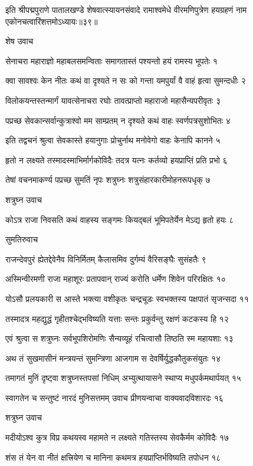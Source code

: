 इति श्रीपद्मपुराणे पातालखण्डे शेषवात्स्यायनसंवादे रामाश्वमेधे वीरमणिपुत्रेण हयग्रहणं नाम एकोनचत्वारिंशत्तमोऽध्यायः॥३९॥


शेष उवाच

सेनाचरा महाराज्ञो महाबलसमन्विताः
समागतास्तं पश्यन्तो हयं रामस्य भूपतेः १

क्वा सावश्वः केन नीतः कथं वा दृश्यते न सः
को गन्ता यमपुर्यां वै वाहं हृत्वा सुमन्दधीः २

विलोकयन्तस्तन्मार्गं यावत्सेनाचरा रघोः
तावत्प्राप्तो महाराजो महासैन्यपरीवृतः ३

पप्रच्छ सेवकान्सर्वान्कुत्राश्वो मम साम्प्रतम्
न दृश्यते कथं वाहः स्वर्णपत्रसुशोभितः ४

इति तद्वचनं श्रुत्वा सेवकास्ते हयानुगाः
प्रोचुर्नाथ मनोवेगो वाहः केनापि कानने ५

हृतो न लक्ष्यते तस्मादस्माभिर्मार्गकोविदैः
तदत्र यत्नः कर्तव्यो हयप्राप्तिं प्रति प्रभो ६

तेषां वचनमाकर्ण्य पप्रच्छ सुमतिं नृपः
शत्रुघ्नः शत्रुसंहारकारीमोहनरूपधृक् ७

शत्रुघ्न उवाच

कोऽत्र राजा निवसति कथं वाहस्य सङ्गमः
कियद्बलं भूमिपतेर्येन मेऽद्य हृतो हयः ८

सुमतिरुवाच

राजन्देवपुरं ह्येतद्देवेनैव विनिर्मितम्
कैलासमिव दुर्गम्यं वैरिसङ्घैः सुसंहतैः ९

अस्मिन्वीरमणी राजा महाशूरः प्रतापवान्
राज्यं करोति धर्मेण शिवेन परिरक्षितः १०

योऽसौ प्रलयकारी स आस्ते भक्त्या वशीकृतः
चन्द्रचूडः स्वभक्तस्य पक्षपातं सृजन्सदा ११

तस्मादत्र महद्युद्धं गृहीतश्चेद्भविष्यति
यत्ताः सन्तः प्रकुर्वन्तु रक्षणं कटकस्य हि १२

एवं श्रुत्वा स शत्रुघ्नः सर्वभूपशिरोमणिः
सैन्यव्यूहं रचित्वासौ तिष्ठति स्म महायशाः १३

अथ तं सुखमासीनं मन्त्रयन्तं सुमन्त्रिणा
आजगाम स देवर्षिर्युद्धकौतुकसंयुतः १४

तमागतं मुनिं दृष्ट्वा शत्रुघ्नस्तपसां निधिम्
अभ्युत्थायासने स्थाप्य मधुपर्कमथार्पयत् १५

स्वागतेन च सन्तुष्टं नारदं मुनिसत्तमम्
उवाच प्रीणयन्वाचा वाक्यवादविशारदः १६

शत्रुघ्न उवाच

मदीयोऽश्व कुत्र विप्र कथयस्व महामते
न लक्ष्यते गतिस्तस्य सेवकैर्मम कोविदैः १७

शंस तं येन वा नीतं क्षत्त्रियेण च मानिना
कथमत्र हयप्राप्तिर्भविष्यति तपोधन १८

